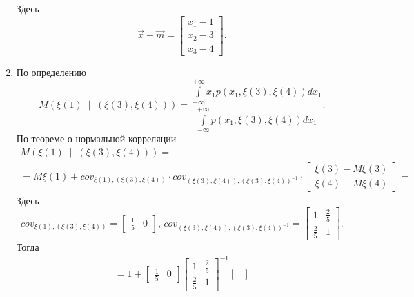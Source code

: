 \begin{enumerate}[label=\alph*)]
  Здесь
  $$ \vec{x} - \vec{m} =
    \begin{bmatrix}
      x_1 - 1 \\
      x_2 - 3 \\
      x_3 - 4
    \end{bmatrix}.$$
  \item По определению
  $$M \left(
      \xi \left( 1 \right) \; \middle| \; \left( \xi \left( 3 \right), \xi \left( 4 \right) \right)
    \right) =
    \frac{\int\limits_{-\infty}^{+\infty}x_1 p\left(x_1,\xi\left(3\right),\xi\left(4\right)\right)dx_1}{\int\limits_{-\infty}^{+\infty}p\left(x_1,\xi\left(3\right),\xi\left(4\right)\right)dx_1}.$$
  По теореме о нормальной корреляции
  \begin{gather*}
    M \left(
      \xi \left( 1 \right) \; \middle| \; \left( \xi \left( 3 \right), \xi \left( 4 \right) \right)
    \right) = \\
    = M \xi \left( 1 \right) +
    cov_{ \xi \left( 1 \right), \left( \xi \left( 3 \right), \xi \left( 4 \right) \right) } \cdot
    cov_{ \left( \xi \left( 3 \right), \xi \left( 4 \right) \right),
      \left( \xi \left( 3 \right), \xi \left( 4 \right) \right)^{-1}} \cdot
    \begin{bmatrix}
      \xi \left( 3 \right) - M \xi \left( 3 \right) \\
      \xi \left( 4 \right) - M \xi \left( 4 \right)
    \end{bmatrix} =
  \end{gather*}
  Здесь
  $$cov_{ \xi \left( 1 \right), \left( \xi \left( 3 \right), \xi \left( 4 \right) \right) } =
    \begin{bmatrix}
      \frac{1}{5} & 0
    \end{bmatrix}, \,
    cov_{ \left( \xi \left( 3 \right), \xi \left( 4 \right) \right),
      \left( \xi \left( 3 \right), \xi \left( 4 \right) \right)^{-1}} =
    \begin{bmatrix}
      1 & \frac{2}{5} \\
      \frac{2}{5} & 1
    \end{bmatrix}.$$
  Тогда
  \begin{gather*}
    = 1 +
    \begin{bmatrix}
      \frac{1}{5} & 0
    \end{bmatrix}
    \begin{bmatrix}
      1 & \frac{2}{5} \\
      \frac{2}{5} & 1
    \end{bmatrix}^{-1}
    \begin{bmatrix}

\end{bmatrix}
\end{gather*}
\end{enumerate}
